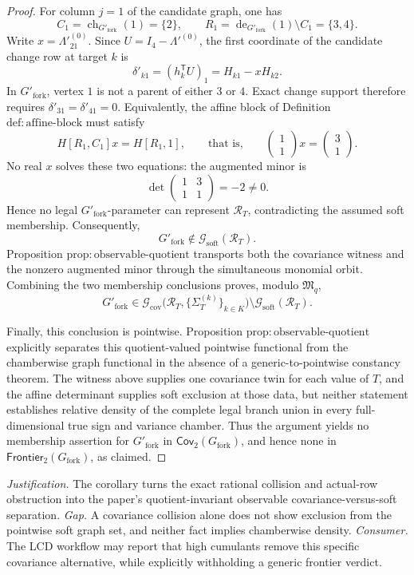 \documentclass{article}
\begin{document}
\begin{proof}
For column \(j=1\) of the candidate graph, one has
\[
 C_1=\operatorname{ch}_{G'_{\mathrm{fork}}}(1)=\{2\},
 \qquad
 R_1=\operatorname{de}_{G'_{\mathrm{fork}}}(1)\setminus C_1=\{3,4\}.
\]
Write \(x=\Lambda'^{(0)}_{21}\).  Since \(U=I_4-\Lambda'^{(0)}\), the first coordinate of the candidate change row at target \(k\) is
\[
 \delta'_{k1}=(h_k^{\mathsf T}U)_1=H_{k1}-xH_{k2}.
\]
In \(G'_{\mathrm{fork}}\), vertex \(1\) is not a parent of either \(3\) or \(4\).  Exact change support therefore requires \(\delta'_{31}=\delta'_{41}=0\).  Equivalently, the affine block of Definition \(\mathrm{def{:}affine\text{-}block}\) must satisfy
\[
 H[R_1,C_1]x=H[R_1,1],
 \qquad\text{that is,}\qquad
 \begin{pmatrix}1\\1\end{pmatrix}x
 =\begin{pmatrix}3\\1\end{pmatrix}.
\]
No real \(x\) solves these two equations: the augmented minor is
\[
 \det\begin{pmatrix}1&3\\1&1\end{pmatrix}=-2\ne0.
\]
Hence no legal \(G'_{\mathrm{fork}}\)-parameter can represent \(\mathcal R_T\), contradicting the assumed soft membership.  Consequently,
\[
 G'_{\mathrm{fork}}\notin\mathcal G_{\mathrm{soft}}(\mathcal R_T).
\]
Proposition \(\mathrm{prop{:}observable\text{-}quotient}\) transports both the covariance witness and the nonzero augmented minor through the simultaneous monomial orbit.  Combining the two membership conclusions proves, modulo \(\mathfrak M_q\),
\[
 G'_{\mathrm{fork}}\in
 \mathcal G_{\mathrm{cov}}
 \bigl(\mathcal R_T,\{\Sigma_T^{(k)}\}_{k\in K}\bigr)
 \setminus\mathcal G_{\mathrm{soft}}(\mathcal R_T).
\]

Finally, this conclusion is pointwise.  Proposition \(\mathrm{prop{:}observable\text{-}quotient}\) explicitly separates this quotient-valued pointwise functional from the chamberwise graph functional in the absence of a generic-to-pointwise constancy theorem.  The witness above supplies one covariance twin for each value of \(T\), and the affine determinant supplies soft exclusion at those data, but neither statement establishes relative density of the complete legal branch union in every full-dimensional true sign and variance chamber.  Thus the argument yields no membership assertion for \(G'_{\mathrm{fork}}\) in \(\mathsf{Cov}_2(G_{\mathrm{fork}})\), and hence none in \(\mathsf{Frontier}_2(G_{\mathrm{fork}})\), as claimed.
\end{proof}
\par\smallskip\noindent \textit{Justification.} The corollary turns the exact rational collision and actual-row obstruction into the paper's quotient-invariant observable covariance-versus-soft separation. \textit{Gap.} A covariance collision alone does not show exclusion from the pointwise soft graph set, and neither fact implies chamberwise density. \textit{Consumer.} The LCD workflow may report that high cumulants remove this specific covariance alternative, while explicitly withholding a generic frontier verdict.
\end{document}
